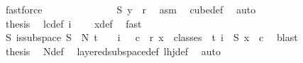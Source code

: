 \begin{isabellebody}
\ fastforce\isanewline
\ \ \ \ \ \ \ \ \ \ \isamarkupfalse%
\ \isamarkupfalse%
\ {\isachardoublequoteopen}{\isasymchi}\ {\isacharparenleft}{\kern0pt}S{}\ y{\isacharparenright}{\kern0pt}\ {\isacharless}{\kern0pt}\ r{\isachardoublequoteclose}\ \isamarkupfalse%
\ asm\ \isamarkupfalse%
\ cube{\isacharunderscore}{\kern0pt}def\ \isamarkupfalse%
\ auto\isanewline
\ \ \ \ \ \ \ \ \isamarkupfalse%
\isanewline
\ \ \ \ \ \ \ \ \isamarkupfalse%
\ \isamarkupfalse%
\ {\isacharquery}{\kern0pt}thesis\ \isamarkupfalse%
\ lc{\isacharunderscore}{\kern0pt}def\ {\isacartoucheopen}i\ {\isacharequal}{\kern0pt}\ {}{\isacartoucheclose}\ \isamarkupfalse%
\ x{\isacharunderscore}{\kern0pt}def\ \isamarkupfalse%
\ fast\isanewline
\ \ \ \ \ \ \isamarkupfalse%
\isanewline
\isanewline
\isanewline
\ \ \ \ \isamarkupfalse%
\isanewline
\ \ \ \ \isamarkupfalse%
\ \isamarkupfalse%
\ {\isachardoublequoteopen}{\isacharparenleft}{\kern0pt}{\isasymexists}S{\isachardot}{\kern0pt}\ is{\isacharunderscore}{\kern0pt}subspace\ S\ {}\ N{\isacharprime}{\kern0pt}\ {\isacharparenleft}{\kern0pt}t\ {\isacharplus}{\kern0pt}\ {}{\isacharparenright}{\kern0pt}\ {\isasymand}\ {\isacharparenleft}{\kern0pt}{\isasymforall}i\ {\isasymin}\ {\isacharbraceleft}{\kern0pt}{\isachardot}{\kern0pt}{\isachardot}{\kern0pt}{}{\isacharbraceright}{\kern0pt}{\isachardot}{\kern0pt}\ {\isasymexists}c\ {\isacharless}{\kern0pt}\ r{\isachardot}{\kern0pt}\ {\isacharparenleft}{\kern0pt}{\isasymforall}x\ {\isasymin}\ classes\ {}\ t\ i{\isachardot}{\kern0pt}\ {\isasymchi}\ {\isacharparenleft}{\kern0pt}S\ x{\isacharparenright}{\kern0pt}\ {\isacharequal}{\kern0pt}\ c{\isacharparenright}{\kern0pt}{\isacharparenright}{\kern0pt}{\isacharparenright}{\kern0pt}{\isachardoublequoteclose}\ \isamarkupfalse%
\ blast\isanewline
\ \ \isamarkupfalse%
\isanewline
\ \ \isamarkupfalse%
\ \isamarkupfalse%
\ {\isacharquery}{\kern0pt}thesis\ \isamarkupfalse%
\ N{\isacharunderscore}{\kern0pt}def\ \isamarkupfalse%
\ layered{\isacharunderscore}{\kern0pt}subspace{\isacharunderscore}{\kern0pt}def\ lhj{\isacharunderscore}{\kern0pt}def\ \isamarkupfalse%
\ auto\isanewline
{}\isamarkupfalse%
%
\endisatagproof

\end{isabellebody}
